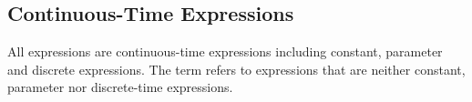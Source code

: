 \subsection{Continuous-Time Expressions}\label{continuous-time-expressions}

All expressions are continuous-time expressions including constant, parameter and discrete expressions.
The term  refers to expressions that are neither constant, parameter nor discrete-time expressions.
